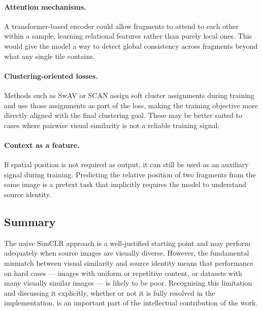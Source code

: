 \documentclass[12pt, a4paper]{article}
\begin{document}
\paragraph{Attention mechanisms.}
A transformer-based encoder could allow fragments to attend to each other within a
sample, learning relational features rather than purely local ones. This would give the
model a way to detect global consistency across fragments beyond what any single tile
contains.

\paragraph{Clustering-oriented losses.}
Methods such as SwAV \parencite{swav2020} or SCAN assign soft cluster assignments during
training and use those assignments as part of the loss, making the training objective
more directly aligned with the final clustering goal. These may be better suited to
cases where pairwise visual similarity is not a reliable training signal.

\paragraph{Context as a feature.}
If spatial position is not required as output, it can still be used as an auxiliary
signal during training. Predicting the relative position of two fragments from the same
image is a pretext task \parencite{noroozi2016} that implicitly requires the model to
understand source identity.

\subsection{Summary}

The naive SimCLR approach is a well-justified starting point and may perform adequately
when source images are visually diverse. However, the fundamental mismatch between
visual similarity and source identity means that performance on hard cases — images with
uniform or repetitive content, or datasets with many visually similar images — is likely
to be poor. Recognising this limitation and discussing it explicitly, whether or not it
is fully resolved in the implementation, is an important part of the intellectual
contribution of the work.

\printbibliography
\end{document}

